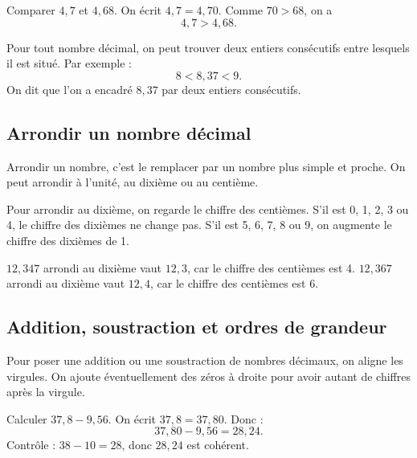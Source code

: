 \documentclass[11pt,a4paper]{article}
\begin{document}
\begin{exemplebox}
Comparer \(4,7\) et \(4,68\). On écrit \(4,7=4,70\). Comme \(70>68\), on a
\[
4,7>4,68.
\]
\end{exemplebox}

\begin{theobox}
Pour tout nombre décimal, on peut trouver deux entiers consécutifs entre lesquels il est situé. Par exemple :
\[
8<8,37<9.
\]
On dit que l'on a encadré \(8,37\) par deux entiers consécutifs.
\end{theobox}

\subsection{Arrondir un nombre décimal}

\begin{definitionbox}
Arrondir un nombre, c'est le remplacer par un nombre plus simple et proche. On peut arrondir à l'unité, au dixième ou au centième.
\end{definitionbox}

\begin{methodbox}
Pour arrondir au dixième, on regarde le chiffre des centièmes. S'il est 0, 1, 2, 3 ou 4, le chiffre des dixièmes ne change pas. S'il est 5, 6, 7, 8 ou 9, on augmente le chiffre des dixièmes de 1.
\end{methodbox}

\begin{exemplebox}
\(12,347\) arrondi au dixième vaut \(12,3\), car le chiffre des centièmes est 4.\newline
\(12,367\) arrondi au dixième vaut \(12,4\), car le chiffre des centièmes est 6.
\end{exemplebox}

\subsection{Addition, soustraction et ordres de grandeur}

\begin{methodbox}
Pour poser une addition ou une soustraction de nombres décimaux, on aligne les virgules. On ajoute éventuellement des zéros à droite pour avoir autant de chiffres après la virgule.
\end{methodbox}

\begin{exemplebox}
Calculer \(37,8-9,56\). On écrit \(37,8=37,80\). Donc :
\[
37,80-9,56=28,24.
\]
Contrôle : \(38-10=28\), donc \(28,24\) est cohérent.
\end{exemplebox}
\end{document}
